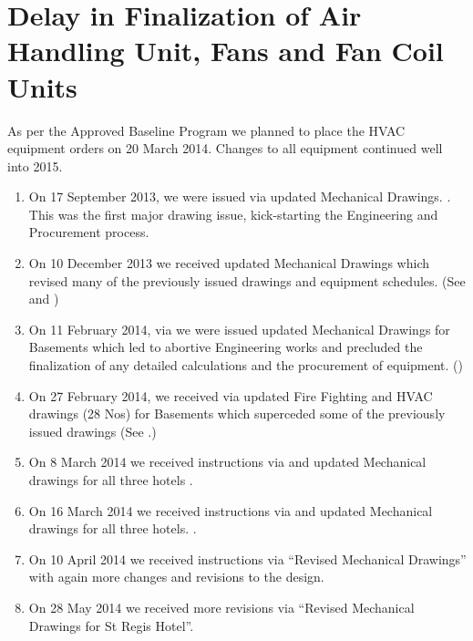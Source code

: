 \chapter{Delay in Finalization of Air Handling Unit, Fans and Fan Coil Units}
\label{ch:ahus}

As per the Approved Baseline Program we planned to place the HVAC equipment orders on 20 March 2014. Changes to all equipment continued well into 2015. 

\begin{enumerate}
\item On 17 September 2013, we were issued via  updated Mechanical Drawings. . This was the first major drawing issue, kick-starting the Engineering and Procurement process.

\item On 10 December 2013 we received updated Mechanical Drawings which revised many of the previously issued drawings and equipment schedules. (See  and )

\item On 11 February 2014, via   we were issued updated Mechanical Drawings for Basements which led to  abortive Engineering works and precluded the finalization of any detailed calculations and the procurement of equipment. ()

\item On 27 February 2014, we received via  updated Fire Fighting and HVAC drawings (28 Nos) for Basements which superceded some of the previously issued drawings (See .)

\item On 8 March 2014 we received instructions via  and updated Mechanical drawings for all three hotels . 

\item On 16 March 2014 we received instructions via  and updated Mechanical drawings for all three hotels.
.

\item On 10 April 2014 we received instructions via  ``Revised Mechanical Drawings'' with again more changes and revisions to the design.

\item On 28 May 2014 we received more revisions via  ``Revised Mechanical Drawings for St Regis Hotel''.


\end{enumerate}
